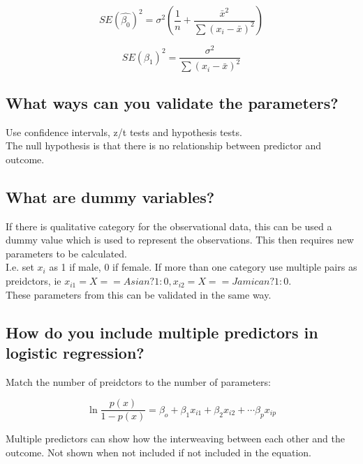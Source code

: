 \documentclass[11pt]{scrartcl} %
\begin{document}
\begin{equation}
	SE(\hat{\beta_0})^2 = \sigma^2(\frac{1}{n} + \frac{\bar{x}^2}{\sum{(x_i-\bar{x})^2}})
\end{equation}

\begin{equation}
	SE(\beta_1)^2 = \frac{\sigma^2}{\sum{(x_i-\bar{x})^2}}
\end{equation}



\subsection{What ways can you validate the parameters?}

Use confidence intervals, z/t tests and hypothesis tests.\\

The null hypothesis is that there is no relationship between predictor and outcome.

\subsection{What are dummy variables?}

If there is qualitative category for the observational data, this can be used a dummy value which is used to represent
the observations. This then requires new parameters to be calculated.\\

I.e. set \(x_i\) as 1 if male, 0 if female. If more than one category use multiple pairs as preidctors, ie 
\(x_{i1} = X==Asian?1:0, x_{i2} = X==Jamican?1:0\).\\

These parameters from this can be validated in the same way.

\subsection{How do you include multiple predictors in logistic regression?}

Match the number of preidctors to the number of parameters:

\begin{equation}
	\ln\frac{p(x)}{1-p(x)} = \beta_o + \beta_1x_{i1} + \beta_2x_{i2} + \cdots \beta_px_{ip}
\end{equation}

Multiple predictors can show how the interweaving between each other and the outcome. Not shown when not included if 
not included in the equation.\\
\end{document}
